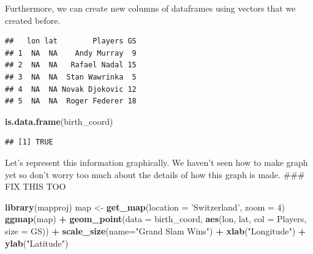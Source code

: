 \documentclass[12pt,]{krantz}
\newenvironment{Shaded}{\begin{snugshade}}{\end{snugshade}}
\newcommand{\KeywordTok}[1]{\textcolor[rgb]{0.27,0.27,0.27}{\textbf{#1}}}
\newcommand{\DataTypeTok}[1]{\textcolor[rgb]{0.27,0.27,0.27}{#1}}
\newcommand{\DecValTok}[1]{\textcolor[rgb]{0.06,0.06,0.06}{#1}}
\newcommand{\StringTok}[1]{\textcolor[rgb]{0.5,0.5,0.5}{#1}}
\newcommand{\OperatorTok}[1]{\textcolor[rgb]{0.43,0.43,0.43}{\textbf{#1}}}
\newcommand{\NormalTok}[1]{#1}
\begin{document}
Furthermore, we can create new columns of dataframes using vectors that
we created before.

\begin{Shaded}
\end{Shaded}

\begin{verbatim}
##   lon lat        Players GS
## 1  NA  NA    Andy Murray  9
## 2  NA  NA   Rafael Nadal 15
## 3  NA  NA  Stan Wawrinka  5
## 4  NA  NA Novak Djokovic 12
## 5  NA  NA  Roger Federer 18
\end{verbatim}

\begin{Shaded}
\begin{Highlighting}[]
\KeywordTok{is.data.frame}\NormalTok{(birth_coord)}
\end{Highlighting}
\end{Shaded}

\begin{verbatim}
## [1] TRUE
\end{verbatim}

Let's represent this information graphically. We haven't seen how to
make graph yet so don't worry too much about the details of how this
graph is made. \#\#\# FIX THIS TOO

\begin{Shaded}
\begin{Highlighting}[]
\KeywordTok{library}\NormalTok{(mapproj)}
\NormalTok{map <-}\StringTok{ }\KeywordTok{get_map}\NormalTok{(}\DataTypeTok{location =} \StringTok{'Switzerland'}\NormalTok{, }\DataTypeTok{zoom =} \DecValTok{4}\NormalTok{)}
\KeywordTok{ggmap}\NormalTok{(map) }\OperatorTok{+}\StringTok{ }\KeywordTok{geom_point}\NormalTok{(}\DataTypeTok{data =}\NormalTok{ birth_coord, }
             \KeywordTok{aes}\NormalTok{(lon, lat, }\DataTypeTok{col =}\NormalTok{ Players, }\DataTypeTok{size =}\NormalTok{ GS)) }\OperatorTok{+}\StringTok{ }
\StringTok{             }\KeywordTok{scale_size}\NormalTok{(}\DataTypeTok{name=}\StringTok{"Grand Slam Wins"}\NormalTok{) }\OperatorTok{+}\StringTok{ }
\StringTok{             }\KeywordTok{xlab}\NormalTok{(}\StringTok{"Longitude"}\NormalTok{) }\OperatorTok{+}\StringTok{ }\KeywordTok{ylab}\NormalTok{(}\StringTok{"Latitude"}\NormalTok{)}
\end{Highlighting}
\end{Shaded}
\end{document}
